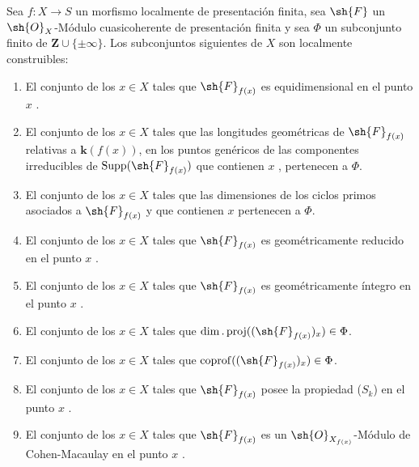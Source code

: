 \begin{proposition}[9.9.2]
\label{IV.9.9.2}
Sea $f:X\to S$ un morfismo localmente de presentación finita, sea $\sh{F}$ un $\sh{O}_X$-Módulo cuasicoherente de presentación finita y sea $\Phi$ un subconjunto finito de $\mathbf{Z}\cup\{\pm\infty\}$.
Los subconjuntos siguientes de $X$ son localmente construibles:
\begin{enumerate}[label=\textup{(\roman*)}]
  \item El conjunto de los $x\in X$ tales que $\sh{F}_{f(x)}$ es equidimensional en el punto $x$ .
  \item El conjunto de los $x\in X$ tales que las longitudes geométricas de $\sh{F}_{f(x)}$ relativas a $\boldsymbol{k}(f(x))$, en los puntos genéricos de las componentes irreducibles de $\operatorname{Supp}(\sh{F}_{f(x)})$ que contienen $x$ , pertenecen a $\Phi$.
  \item El conjunto de los $x\in X$ tales que las dimensiones de los ciclos primos asociados a $\sh{F}_{f(x)}$ y que contienen $x$ pertenecen a $\Phi$.
  \item El conjunto de los $x\in X$ tales que $\sh{F}_{f(x)}$ es geométricamente reducido en el punto $x$ .
  \item El conjunto de los $x\in X$ tales que $\sh{F}_{f(x)}$ es geométricamente íntegro en el punto $x$ .
  \item El conjunto de los $x\in X$ tales que $\dim.\operatorname{proj}((\sh{F}_{f(x)})_x)\in\Phi$.
  \item El conjunto de los $x\in X$ tales que $\operatorname{coprof}((\sh{F}_{f(x)})_x)\in\Phi$.
  \item El conjunto de los $x\in X$ tales que $\sh{F}_{f(x)}$ posee la propiedad ($S_k$) en el punto $x$ .
  \item El conjunto de los $x\in X$ tales que $\sh{F}_{f(x)}$ es un $\sh{O}_{X_{f(x)}}$-Módulo de Cohen-Macaulay en el punto $x$ .
\end{enumerate}
\end{proposition}

